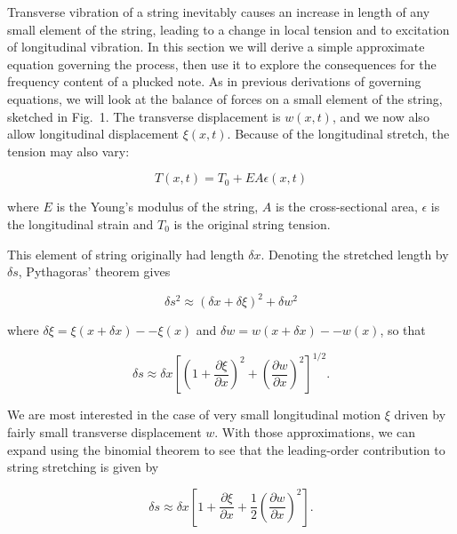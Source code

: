   Transverse vibration of a string inevitably causes an increase in length of 
  any small element of the string, leading to a change in local tension and to 
  excitation of longitudinal vibration. In this section we will derive a simple 
  approximate equation governing the process, then use it to explore the 
  consequences for the frequency content of a plucked note. As in previous 
  derivations of governing equations, we will look at the balance of forces on 
  a small element of the string, sketched in Fig.\ 1. The transverse 
  displacement is $w(x,t)$, and we now also allow longitudinal displacement 
  $\xi(x,t)$. Because of the longitudinal stretch, the tension may also vary: 

  \begin{equation*}T(x,t) = T_0 +EA\epsilon(x,t) \tag{1}\end{equation*} 

  \noindent{}where $E$ is the Young's modulus of the string, $A$ is the 
  cross-sectional area, $\epsilon$ is the longitudinal strain and $T_0$ is the 
  original string tension. 


  This element of string originally had length $\delta x$. Denoting the 
  stretched length by $\delta s$, Pythagoras' theorem gives 

  \begin{equation*}\delta s^2 \approx (\delta x + \delta \xi)^2 + \delta w^2 
  \tag{2} \end{equation*} 

  \noindent{}where $\delta \xi=\xi(x + \delta x) -- \xi(x)$ and $\delta w=w(x + 
  \delta x) -- w(x)$, so that 

  \begin{equation*}\delta s \approx \delta x \left[ \left(1 + \dfrac{\partial 
  \xi}{\partial x}\right)^2 + \left(\dfrac{\partial w}{\partial x}\right)^2 
  \right]^{1/2} . \tag{3}\end{equation*} 

  We are most interested in the case of very small longitudinal motion $\xi$ 
  driven by fairly small transverse displacement $w$. With those 
  approximations, we can expand using the binomial theorem to see that the 
  leading-order contribution to string stretching is given by 

  \begin{equation*}\delta s \approx \delta x \left[ 1 + \dfrac{\partial 
  \xi}{\partial x} + \dfrac{1}{2}\left(\dfrac{\partial w}{\partial x}\right)^2 
  \right] . \tag{4}\end{equation*} 

